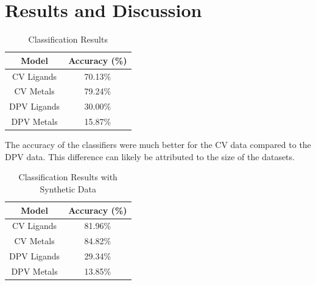 \section{Results and Discussion}
\begin{table}[!h]
\begin{center}
\begin{tabular}{c|c}
Model & Accuracy (\%) \\
\hline
CV Ligands & 70.13\% \\
CV Metals & 79.24\% \\
DPV Ligands & 30.00\% \\
DPV Metals & 15.87\%
\end{tabular}
\caption{Classification Results}
\end{center}
\end{table}
The accuracy of the classifiers were much better for the CV data compared to the DPV data. This difference can likely be attributed to the size of the datasets. 
\begin{table}[!h]
\begin{center}
\begin{tabular}{c|c}
Model & Accuracy (\%) \\
\hline
CV Ligands & 81.96\% \\
CV Metals & 84.82\% \\
DPV Ligands & 29.34\% \\
DPV Metals & 13.85\%
\end{tabular}
\caption{Classification Results with Synthetic Data}
\end{center}
\end{table}
